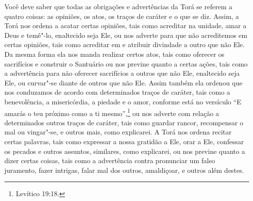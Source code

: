 Você deve saber que todas as obrigações e advertências da Torá\starr{} se
referem a quatro coisas: as opiniões, os atos, os traços de caráter e o
que se diz. Assim, a Torá\starr{} nos ordena a acatar certas opiniões, tais
como acreditar na unidade, amar a Deus e temê"-lo, enaltecido seja Ele,
ou nos adverte para que não acreditemos em certas opiniões, tais como
acreditar em e atribuir divindade a outro que não Ele. Da mesma forma
ela nos manda realizar certos atos, tais como oferecer os sacrifícios e
construir o Santuário ou nos previne quanto a certas ações, tais como a
advertência para não oferecer sacrifícios a outros que não Ele,
enaltecido seja Ele, ou curvar"-se diante de outros que não Ele. Assim
também ela ordenou que nos conduzamos de acordo com determinados traços
de caráter, tais como a benevolência, a misericórdia, a piedade e o
amor, conforme está no versículo ``E amarás o teu próximo como a ti
mesmo'',\footnote{Levítico 19:18.} ou nos adverte com relação a determinados
outros traços de caráter, tais como guardar rancor, recompensar o mal
ou vingar"-se, e outros mais, como explicarei. A Torá\starr{} nos ordena recitar
certas palavras, tais como expressar a nossa gratidão a Ele, orar a
Ele, confessar os pecados e outros assuntos,
similares, como explicarei, ou nos previne quanto a dizer certas coisas,
tais como a advertência contra pronunciar um falso juramento, fazer
intrigas, falar mal dos outros, amaldiçoar, e outros além destes.

